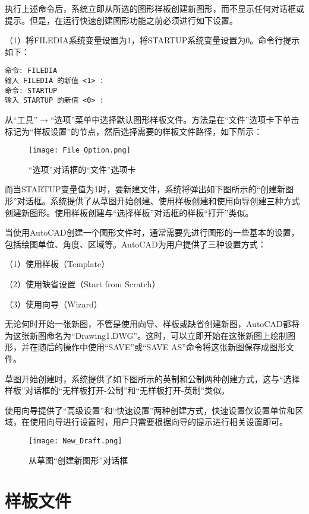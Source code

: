 执行上述命令后，系统立即从所选的图形样板创建新图形，而不显示任何对话框或提示。但是，在运行快速创建图形功能之前必须进行如下设置。

（1）将FILEDIA系统变量设置为1，将STARTUP系统变量设置为0。命令行提示如下：

\begin{verbatim}
命令: FILEDIA
输入 FILEDIA 的新值 <1> :
命令: STARTUP
输入 STARTUP 的新值 <0> :
\end{verbatim}

从“工具”$\to$“选项”菜单中选择默认图形样板文件。方法是在“文件”选项卡下单击标记为“样板设置”的节点，然后选择需要的样板文件路径，如下所示：

\begin{figure}[htbp]
\centering
\texttt{[image: File\_Option.png]}
\caption{“选项”对话框的“文件”选项卡}
\end{figure}

而当STARTUP变量值为1时，要新建文件，系统将弹出如下图所示的“创建新图形”对话框。系统提供了从草图开始创建、使用样板创建和使用向导创建三种方式创建新图形。使用样板创建与“选择样板”对话框的样板“打开”类似。

当使用AutoCAD创建一个图形文件时，通常需要先进行图形的一些基本的设置，包括绘图单位、角度、区域等。AutoCAD为用户提供了三种设置方式：

（1）使用样板（Template）

（2）使用缺省设置（Start from Scratch）

（3）使用向导（Wizard）

无论何时开始一张新图，不管是使用向导、样板或缺省创建新图，AutoCAD都将为这张新图命名为“Drawing1.DWG”。这时，可以立即开始在这张新图上绘制图形，并在随后的操作中使用“SAVE”或“SAVE AS”命令将这张新图保存成图形文件。

草图开始创建时，系统提供了如下图所示的英制和公制两种创建方式，这与“选择样板”对话框的“无样板打开-公制”和“无样板打开-英制”类似。

使用向导提供了“高级设置”和“快速设置”两种创建方式，快速设置仅设置单位和区域，在使用向导进行设置时，用户只需要根据向导的提示进行相关设置即可。

\begin{figure}[htbp]
\centering
\texttt{[image: New\_Draft.png]}
\caption{从草图“创建新图形”对话框}
\end{figure}

\chapter{样板文件}


